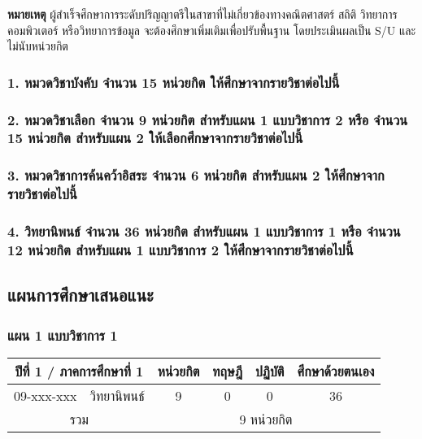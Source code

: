 \par\noindent\textbf{หมายเหตุ} ผู้สำเร็จศึกษาการระดับปริญญาตรีในสาขาที่ไม่เกี่ยวข้องทางคณิตศาสตร์ สถิติ วิทยาการคอมพิวเตอร์ หรือวิทยาการข้อมูล จะต้องศึกษาเพิ่มเติมเพื่อปรับพื้นฐาน โดยประเมินผลเป็น S/U และไม่นับหน่วยกิต


\subsubsection*{1. หมวดวิชาบังคับ จำนวน 15 หน่วยกิต ให้ศึกษาจากรายวิชาต่อไปนี้}



\subsubsection*{2. หมวดวิชาเลือก จำนวน 9 หน่วยกิต สำหรับแผน 1 แบบวิชาการ 2 หรือ จำนวน 15 หน่วยกิต สำหรับแผน 2 ให้เลือกศึกษาจากรายวิชาต่อไปนี้}



\subsubsection*{3. หมวดวิชาการค้นคว้าอิสระ จำนวน 6 หน่วยกิต สำหรับแผน 2 ให้ศึกษาจากรายวิชาต่อไปนี้}



\subsubsection*{4. วิทยานิพนธ์ จำนวน 36 หน่วยกิต สำหรับแผน 1 แบบวิชาการ 1 หรือ จำนวน 12 หน่วยกิต สำหรับแผน 1 แบบวิชาการ 2 ให้ศึกษาจากรายวิชาต่อไปนี้}



\clearpage
\subsection*{แผนการศึกษาเสนอแนะ}

\subsubsection*{แผน 1 แบบวิชาการ 1}

\begin{tabular}{|cp{}|cccc|}
\hline
\multicolumn{2}{|c|}{ปีที่ 1 / ภาคการศึกษาที่ 1} & \multicolumn{1}{c|}{หน่วยกิต} & \multicolumn{1}{c|}{ทฤษฎี} & \multicolumn{1}{c|}{ปฏิบัติ} & ศึกษาด้วยตนเอง \\ \hline
\multicolumn{1}{|c|}{09-xxx-xxx}  & วิทยานิพนธ์  & \multicolumn{1}{c|}{9}        & \multicolumn{1}{c|}{0}     & \multicolumn{1}{c|}{0}       & 36             \\ \hline
\multicolumn{2}{|c|}{รวม}                        & \multicolumn{4}{c|}{9 หน่วยกิต}                                                                            \\ \hline
\end{tabular}

